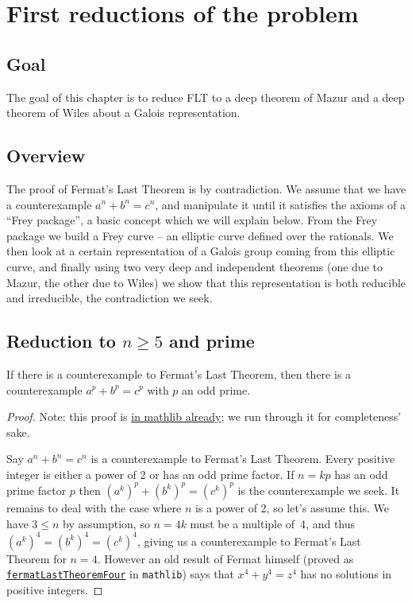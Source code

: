 \chapter{First reductions of the problem}\label{ch_reductions}

\section{Goal}

The goal of this chapter is to reduce FLT to a deep theorem of Mazur and a deep theorem of Wiles
about a Galois representation.

\section{Overview}
The proof of Fermat's Last Theorem is by contradiction. We assume that we have a counterexample
$a^n+b^n=c^n$, and manipulate it until it satisfies the axioms of a ``Frey package'', a basic
concept which we will explain below. From the
Frey package we build a Frey curve -- an elliptic curve defined over the rationals. We then look at
a certain representation of a Galois group coming from this elliptic curve, and finally using two
very deep and independent theorems (one due to Mazur, the other due to Wiles) we show that this
representation is both reducible and irreducible, the contradiction we seek.

\section{Reduction to \texorpdfstring{$n\geq5$}{ngeq5} and prime}

\begin{lemma}\label{FermatLastTheorem.of_odd_primes}\leanok
  If there is a counterexample to Fermat's Last Theorem, then there is a counterexample $a^p+b^p=c^p$
  with $p$ an odd prime.
\end{lemma}
\begin{proof}\leanok
  Note: this proof is \href{https://leanprover-community.github.io/mathlib4_docs/Mathlib/NumberTheory/FLT/Four.html#FermatLastTheorem.of_odd_primes}{in mathlib already};
  we run through it for completeness' sake.

  Say $a^n + b^n = c^n$ is a counterexample to Fermat's Last Theorem. Every positive integer is either
  a power of 2 or has an odd prime factor. If $n=kp$ has an odd prime factor $p$ then
  $(a^k)^p+(b^k)^p=(c^k)^p$ is the counterexample we seek. It remains to deal with the case where
  $n$ is a power of 2, so let's assume this. We have $3\leq n$ by assumption, so
  $n=4k$ must be a multiple of~4, and thus $(a^k)^4=(b^k)^4=(c^k)^4$, giving us a counterexample
  to Fermat's Last Theorem for $n=4$. However an old result of Fermat himself (proved as
  \href{https://leanprover-community.github.io/mathlib4_docs/Mathlib/NumberTheory/FLT/Four.html#fermatLastTheoremFour}{\tt fermatLastTheoremFour}
  in {\tt mathlib}) says that $x^4+y^4=z^4$ has no solutions in positive integers.
\end{proof}

